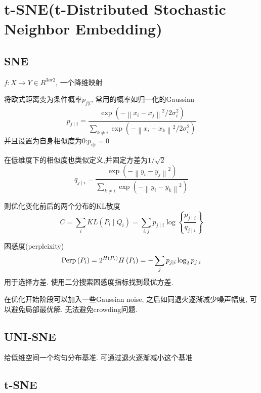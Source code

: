 \documentclass{article}
\begin{document}
\section{t-SNE(t-Distributed Stochastic Neighbor Embedding)}

\subsection{SNE}

 $f:X\to Y\in R^{3 or 2}$, 一个降维映射

将欧式距离变为条件概率$p_{j|i}$, 常用的概率如归一化的Gaussian
\begin{equation}
    p_{j \mid i}=\frac{\exp \left(-\left\|x_{i}-x_{j}\right\|^{2} / 2 \sigma_{i}^{2}\right)}{\sum_{k \neq i} \exp \left(-\left\|x_{i}-x_{k}\right\|^{2} / 2 \sigma_{i}^{2}\right)}
\end{equation}
并且设置为自身相似度为0:$p_{i|i}=0$

在低维度下的相似度也类似定义,并固定方差为$1/\sqrt{2}$
\begin{equation}
    q_{j \mid i}=\frac{\exp \left(-\left\|y_{i}-y_{j}\right\|^{2} \right)}{\sum_{k \neq i} \exp \left(-\left\|y_{i}-y_{k}\right\|^{2}\right)}
\end{equation}

则优化变化前后的两个分布的KL散度
\begin{equation}
    C=\sum_{i} K L\left(P_{i} \mid Q_{i}\right)=\sum_{i,j} p_{j \mid i} \log \left\{\frac{p_{j \mid i}}{q_{j \mid i}}\right\}
\end{equation}

困惑度(perpleixity)
\begin{equation}
    \operatorname{Perp}\left(P_{i}\right)=2^{H\left(P_{i}\right)}\\
    H\left(P_{i}\right)=-\sum_{j} p_{j \mid i} \log _{2} p_{j \mid i}
\end{equation}
用于选择方差. 使用二分搜索困惑度指标找到最优方差.

在优化开始阶段可以加入一些Gaussian noise, 之后如同退火逐渐减少噪声幅度, 可以避免局部最优解. 无法避免crowding问题.

\subsection{UNI-SNE}

给低维空间一个均匀分布基准. 可通过退火逐渐减小这个基准

\subsection{t-SNE}
\end{document}
